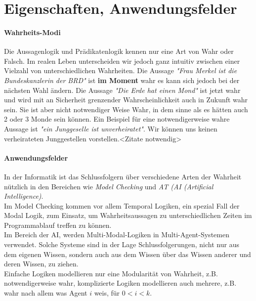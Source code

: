 
\section{Eigenschaften, Anwendungsfelder} %
\label{sec:eigenschaften_anwendungsfelder}

\paragraph{Wahrheits-Modi} %
\label{par:wahrheits_modi}

Die Aussagenlogik und Prädikatenlogik kennen nur eine Art von Wahr oder Falsch. Im realen Leben unterscheiden wir jedoch ganz intuitiv zwischen einer Vielzahl von unterschiedlichen Wahrheiten.
Die Aussage \emph{"Frau Merkel ist die Bundeskanzlerin der BRD"} ist \textbf{im Moment} wahr es kann sich jedoch bei der nächsten Wahl ändern.
Die Aussage \emph{"Die Erde hat einen Mond"} ist jetzt wahr und wird mit an Sicherheit grenzender Wahrscheinlichkeit auch in Zukunft wahr sein. Sie ist aber nicht notwendiger Weise Wahr, in dem sinne als es hätten auch 2 oder 3 Monde sein können.
Ein Beispiel für eine notwendigerweise wahre Aussage ist \emph{"ein Junggeselle ist unverheiratet"}. Wir können uns keinen verheirateten Junggestellen vorstellen.<Zitate notwendig>


\paragraph{Anwendungsfelder} %
\label{par:anwendungsfelder}

In der Informatik ist das Schlussfolgern über verschiedene Arten der Wahrheit nützlich in den Bereichen wie \emph{Model Checking} und \emph{AT (AI (Artificial Intelligence)}. \\
Im Model Checking kommen vor allem Temporal Logiken, ein spezial Fall der Modal Logik, zum Einsatz, um Wahrheitsaussagen zu unterschiedlichen Zeiten im Programmablauf treffen zu können. \\
Im Bereich der AI, werden Multi-Modal-Logiken in Multi-Agent-Systemen verwendet. Solche Systeme sind in der Lage Schlussfolgerungen, nicht nur aus dem eigenen Wissen, sondern auch aus dem Wissen über das Wissen anderer und deren Wissen, zu ziehen.\\
Einfache Logiken modellieren nur eine Modularität von Wahrheit, z.B. notwendigerweise wahr, komplizierte Logiken modellieren auch mehrere, z.B. wahr nach allem was Agent $i$ weis, für $ 0 < i < k$. \cite[S.306f]{huth2004logic}\\




